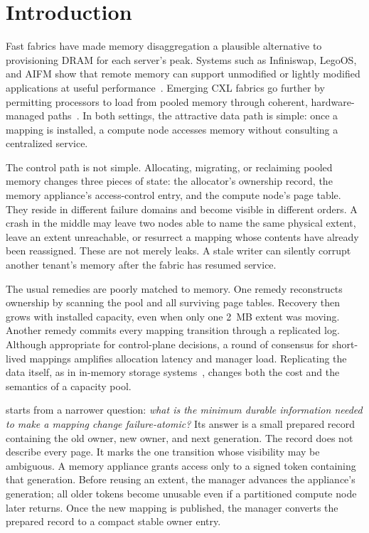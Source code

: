 \section{Introduction}
\label{sec:introduction}

Fast fabrics have made memory disaggregation a plausible alternative to
provisioning DRAM for each server's peak. Systems such as Infiniswap,
LegoOS, and AIFM show that remote memory can support unmodified or lightly
modified applications at useful performance~\cite{gu2017infiniswap,
shan2018legoos,ruan2020aifm}. Emerging CXL fabrics go further by permitting
processors to load from pooled memory through coherent, hardware-managed
paths~\cite{cxl2022spec}. In both settings, the attractive data path is simple:
once a mapping is installed, a compute node accesses memory without consulting
a centralized service.

The control path is not simple. Allocating, migrating, or reclaiming pooled
memory changes three pieces of state: the allocator's ownership record, the
memory appliance's access-control entry, and the compute node's page table.
They reside in different failure domains and become visible in different
orders. A crash in the middle may leave two nodes able to name the same physical
extent, leave an extent unreachable, or resurrect a mapping whose contents
have already been reassigned. These are not merely leaks. A stale writer can
silently corrupt another tenant's memory after the fabric has resumed service.

The usual remedies are poorly matched to memory. One remedy reconstructs
ownership by scanning the pool and all surviving page tables. Recovery then
grows with installed capacity, even when only one 2~MB extent was moving.
Another remedy commits every mapping transition through a replicated log.
Although appropriate for control-plane decisions, a round of consensus for
short-lived mappings amplifies allocation latency and manager load. Replicating
the data itself, as in in-memory storage systems~\cite{dragojevic2014farm,
ousterhout2015ramcloud}, changes both the cost and the semantics of a capacity
pool.

\system starts from a narrower question: \emph{what is the minimum durable
information needed to make a mapping change failure-atomic?} Its answer is a
small prepared record containing the old owner, new owner, and next generation.
The record does not describe every page. It marks the one transition whose
visibility may be ambiguous. A memory appliance grants access only to a signed
token containing that generation. Before reusing an extent, the manager
advances the appliance's generation; all older tokens become unusable even if
a partitioned compute node later returns. Once the new mapping is published,
the manager converts the prepared record to a compact stable owner entry.

